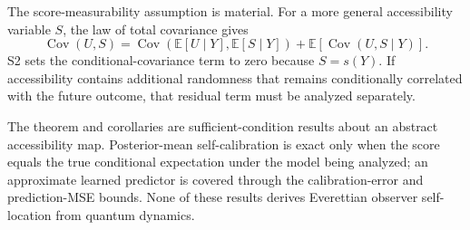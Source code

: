 The score-measurability assumption is material. For a more general accessibility variable $S$, the law of total covariance gives
\[
\operatorname{Cov}(U,S)
=
\operatorname{Cov}(\mathbb E[U\mid Y],\mathbb E[S\mid Y])
+
\mathbb E[\operatorname{Cov}(U,S\mid Y)].
\]
S2 sets the conditional-covariance term to zero because $S=s(Y)$. If accessibility contains additional randomness that remains conditionally correlated with the future outcome, that residual term must be analyzed separately.

The theorem and corollaries are sufficient-condition results about an abstract accessibility map. Posterior-mean self-calibration is exact only when the score equals the true conditional expectation under the model being analyzed; an approximate learned predictor is covered through the calibration-error and prediction-MSE bounds. None of these results derives Everettian observer self-location from quantum dynamics.
